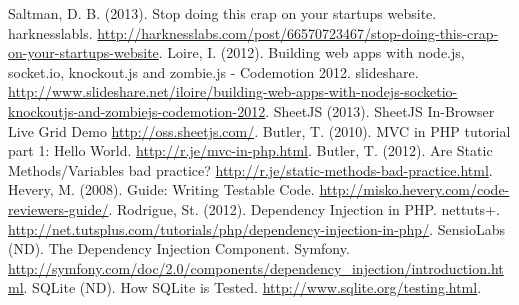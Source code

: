 \begin{thebibliography}{9}
 Saltman, D. B. (2013). Stop doing this crap on your
startups website. harknesslabls.
\url{http://harknesslabs.com/post/66570723467/stop-doing-this-crap-on-your-startups-website}.
 Loire, I. (2012). Building web apps with node.js, socket.io,
knockout.js and zombie.js - Codemotion 2012. slideshare.
\url{http://www.slideshare.net/iloire/building-web-apps-with-nodejs-socketio-knockoutjs-and-zombiejs-codemotion-2012}.
 SheetJS (2013). SheetJS In-Browser Live Grid Demo
\url{http://oss.sheetjs.com/}.
 Butler, T. (2010). MVC in PHP tutorial part 1: Hello
World. \url{http://r.je/mvc-in-php.html}.
 Butler, T. (2012). Are Static Methods/Variables bad
practice? \url{http://r.je/static-methods-bad-practice.html}.
 Hevery, M. (2008). Guide: Writing Testable
Code. \url{http://misko.hevery.com/code-reviewers-guide/}.
 Rodrigue, St. (2012).  Dependency Injection in
PHP. nettuts+.
\url{http://net.tutsplus.com/tutorials/php/dependency-injection-in-php/}.
 SensioLabs (ND). The Dependency Injection
Component. Symfony.
\url{http://symfony.com/doc/2.0/components/dependency_injection/introduction.html}.
 SQLite (ND). How SQLite is
Tested. \url{http://www.sqlite.org/testing.html}.
\end{thebibliography}
